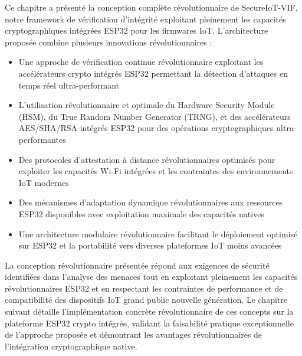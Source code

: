 Ce chapitre a présenté la conception complète révolutionnaire de SecureIoT-VIF, notre framework de vérification d'intégrité exploitant pleinement les capacités cryptographiques intégrées ESP32 pour les firmwares IoT. L'architecture proposée combine plusieurs innovations révolutionnaires :

\begin{itemize}
    \item Une approche de vérification continue révolutionnaire exploitant les accélérateurs crypto intégrés ESP32 permettant la détection d'attaques en temps réel ultra-performant
    \item L'utilisation révolutionnaire et optimale du Hardware Security Module (HSM), du True Random Number Generator (TRNG), et des accélérateurs AES/SHA/RSA intégrés ESP32 pour des opérations cryptographiques ultra-performantes
    \item Des protocoles d'attestation à distance révolutionnaires optimisés pour exploiter les capacités Wi-Fi intégrées et les contraintes des environnements IoT modernes
    \item Des mécanismes d'adaptation dynamique révolutionnaires aux ressources ESP32 disponibles avec exploitation maximale des capacités natives
    \item Une architecture modulaire révolutionnaire facilitant le déploiement optimisé sur ESP32 et la portabilité vers diverses plateformes IoT moins avancées
\end{itemize}

La conception révolutionnaire présentée répond aux exigences de sécurité identifiées dans l'analyse des menaces tout en exploitant pleinement les capacités révolutionnaires ESP32 et en respectant les contraintes de performance et de compatibilité des dispositifs IoT grand public nouvelle génération. Le chapitre suivant détaille l'implémentation concrète révolutionnaire de ces concepts sur la plateforme ESP32 crypto intégrée, validant la faisabilité pratique exceptionnelle de l'approche proposée et démontrant les avantages révolutionnaires de l'intégration cryptographique native.